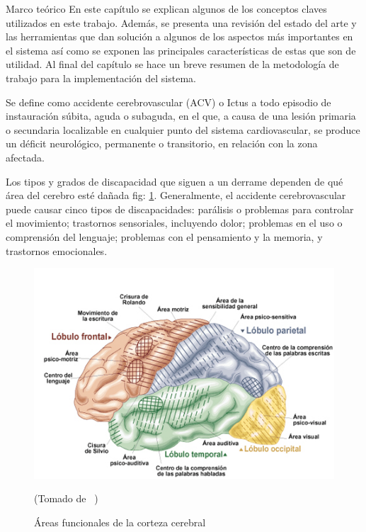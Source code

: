 \begin{thesischapter}{1} {Marco teórico}
    En este capítulo se explican algunos de los conceptos claves utilizados en este trabajo. Además, se presenta una revisión del estado del arte y las herramientas que dan solución a algunos de los aspectos más importantes en el sistema así como se exponen las principales características de estas que son de utilidad. Al final del capítulo se hace un breve resumen de la metodología de trabajo para la implementación del sistema.

    
    \vspace{10pt}
    Se define como accidente cerebrovascular (ACV) o Ictus a todo episodio de instauración súbita, aguda o subaguda, en el que, a causa de una lesión primaria o secundaria localizable en cualquier punto del sistema cardiovascular, se produce un déficit neurológico, permanente o transitorio, en relación con la zona afectada.~\cite{ictus}

    \vspace{10pt}
    Los tipos y grados de discapacidad que siguen a un derrame dependen de qué área del cerebro esté dañada fig: \ref{fig: cerebralcortex}. Generalmente, el accidente cerebrovascular puede causar cinco tipos de discapacidades: parálisis o problemas para controlar el movimiento; trastornos sensoriales, incluyendo dolor; problemas en el uso o comprensión del lenguaje; problemas con el pensamiento y la memoria, y trastornos emocionales.~\cite{post-strok}

    \begin{figure}[ht]
        \centering
        \includegraphics[scale=0.5]{images/brain.jpg}
        \caption{Áreas funcionales de la corteza cerebral}
        (Tomado de ~\cite{areacereabral})
        \label{fig: cerebralcortex}
    \end{figure}


\end{thesischapter}
